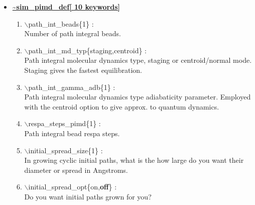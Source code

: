 \begin{itemize}
\begin{enumerate}
\end{enumerate}

\clearpage
\huge
\item[] \underline{\bf \~{}sim\_pimd\_def[ 10 keywords]}
\begin{enumerate}

 \vspace{0.15in} \Large
 \item  $\backslash$path\_int\_beads\{1\} : \\
    \large
     Number of path integral beads.

 \vspace{0.15in} \Large
 \item  $\backslash$path\_int\_md\_typ\{staging,centroid\} : \\
    \large
     Path integral molecular dynamics type, staging or centroid/normal mode.
     Staging gives the fastest equilibration.

 \vspace{0.15in} \Large
 \item  $\backslash$path\_int\_gamma\_adb\{1\} : \\
    \large
     Path integral molecular dynamics type adiabaticity parameter.
     Employed with the centroid option to give approx. to quantum dynamics.

 \vspace{0.15in} \Large
 \item  $\backslash$respa\_steps\_pimd\{1\} : \\
    \large
     Path integral bead respa steps.

 \vspace{0.15in} \Large
 \item  $\backslash$initial\_spread\_size\{1\} : \\
    \large
    In growing cyclic initial paths, what is the how large do you
    want their diameter or spread in Angstroms.

 \vspace{0.15in} \Large
 \item  $\backslash$initial\_spread\_opt\{on,{\bf off}\} : \\
    \large
    Do you want initial paths grown for you?

\end{enumerate}

\end{itemize}


